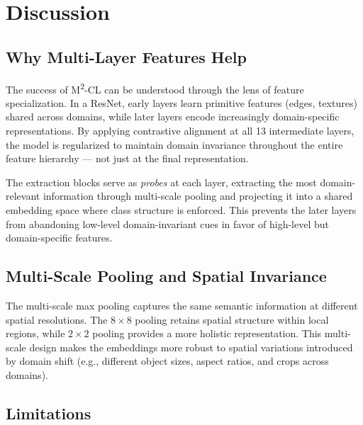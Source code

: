 \documentclass[12pt,a4paper]{article}
\begin{document}
\section{Discussion}
\label{sec:discussion}

\subsection{Why Multi-Layer Features Help}

The success of M\textsuperscript{2}-CL can be understood through the lens of feature
specialization. In a ResNet, early layers learn primitive features (edges, textures)
shared across domains, while later layers encode increasingly domain-specific
representations. By applying contrastive alignment at all 13 intermediate layers, the
model is regularized to maintain domain invariance throughout the entire feature
hierarchy — not just at the final representation.

The extraction blocks serve as \emph{probes} at each layer, extracting the most
domain-relevant information through multi-scale pooling and projecting it into a shared
embedding space where class structure is enforced. This prevents the later layers from
abandoning low-level domain-invariant cues in favor of high-level but domain-specific
features.

\subsection{Multi-Scale Pooling and Spatial Invariance}

The multi-scale max pooling captures the same semantic information at different spatial
resolutions. The $8{\times}8$ pooling retains spatial structure within local regions,
while $2{\times}2$ pooling provides a more holistic representation. This multi-scale
design makes the embeddings more robust to spatial variations introduced by domain shift
(e.g., different object sizes, aspect ratios, and crops across domains).

\subsection{Limitations}
\end{document}
